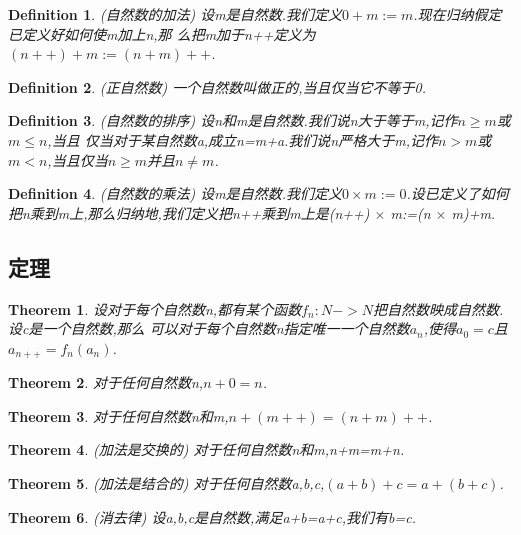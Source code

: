 \documentclass[UTF-8]{ctexart}
\newtheorem{definition}{Definition}[section]
\newtheorem{theorem}{Theorem}[section]
\begin{document}
\begin{definition}
(自然数的加法) 设m是自然数.我们定义$0+m:=m$.现在归纳假定已定义好如何使m加上n,那
么把m加于n++定义为$(n++)+m:=(n+m)++$.
\end{definition}

\begin{definition}
(正自然数) 一个自然数叫做正的,当且仅当它不等于0.
\end{definition}

\begin{definition}
  (自然数的排序) 设n和m是自然数.我们说n大于等于m,记作$n \geq m$或$m \leq n$,当且
  仅当对于某自然数a,成立n=m+a.我们说n严格大于m,记作$n>m$或$m<n$,当且仅当$n\geq m
  $并且$n \ne m$.
\end{definition}

\begin{definition}


(自然数的乘法) 设m是自然数.我们定义$0 \times  m:=0$.设已定义了如何把n乘到m上,那么归纳地,我们定义把n++乘到m上是(n++) $ \times $ m:=(n $ \times $ m)+m.
\end{definition}

\subsection{定理}

\begin{theorem}
设对于每个自然数n,都有某个函数$f_n:N->N$把自然数映成自然数.设c是一个自然数,那么
可以对于每个自然数n指定唯一一个自然数$a_n$,使得$a_0=c$且$a_{n++}=f_n(a_n)$.
\end{theorem}

\begin{theorem}
  对于任何自然数n,$n+0=n$.
\end{theorem}

\begin{theorem}
  对于任何自然数n和m,$n+(m++)=(n+m)++$.
\end{theorem}

\begin{theorem}
(加法是交换的)  对于任何自然数n和m,n+m=m+n.
\end{theorem}

\begin{theorem}
(加法是结合的)  对于任何自然数a,b,c,$(a+b)+c=a+(b+c)$.
\end{theorem}

\begin{theorem}
(消去律)  设a,b,c是自然数,满足a+b=a+c,我们有b=c.
\end{theorem}
\end{document}
